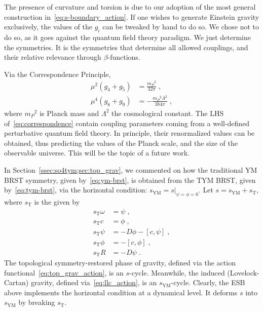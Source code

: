 \documentclass[../main.tex]{subfiles}
\begin{document}
The presence of curvature and torsion is due to our adoption of the most general construction in~\eqref{eq:s-boundary_action}. If one wishes to generate Einstein gravity exclusively, the values of the $ g_i $ can be tweaked by hand to do so. We chose not to do so, as it goes against the quantum field theory paradigm. We just determine the symmetries. It is the symmetries that determine all allowed couplings, and their relative relevance through $ \beta $-functions.

Via the Correspondence Principle,
\begin{subequations}%
  \label{eq:correspondence}
  \begin{align}
    \mu^2 \left( g_4+g_5 \right) & = \frac{{m_P}^2}{32\pi} \;,            \\
    \mu^4 \left( g_8+g_9 \right) & = -\frac{{m_P}^2\Lambda^2}{384\pi} \;,
  \end{align}
\end{subequations}
where ${m_P}^2$ is Planck mass and $\Lambda^2$ the cosmological constant. The LHS of~\eqref{eq:correspondence} contain coupling parameters coming from a well-defined perturbative quantum field theory. In principle, their renormalized values can be obtained, thus predicting the values of the Planck scale, and the size of the observable universe. This will be the topic of a future work.

In Section~\ref{ssec:so4tym;sec:top_grav}, we commented on how the traditional YM BRST symmetry, given by~\eqref{eq:ym-brst}, is obtained from the TYM BRST, given by~\eqref{eq:tym-brst}, via the horizontal condition: $ s_{\text{YM}} = s|_{\psi = \phi = 0} $. Let $ s = s_{\text{YM}} + s_{\text{T}} $, where $ s_{\text{T}} $ is the  given by
\begin{subequations}%
  \label{eq:s_T}
  \begin{align}
    s_{\text{T}} \omega & = \psi \;,                              \\
    s_{\text{T}} c      & = \phi \;,                              \\
    s_{\text{T}} \psi   & = - D \phi - \left[ c, \psi \right] \;, \\
    s_{\text{T}} \phi   & = - \left[ c, \phi \right] \;,          \\
    s_{\text{T}} R      & = - D \psi \;.
  \end{align}
\end{subequations}
The topological symmetry-restored phase of gravity, defined via the action functional~\eqref{eq:top_grav_action}, is an $s$-cycle. Meanwhile, the induced (Lovelock-Cartan) gravity, defined via~\eqref{eq:llc_action}, is an $ s_{\text{YM}} $-cycle. Clearly, the ESB above implements the horizontal condition at a dynamical level. It deforms $ s $ into $ s_{\text{YM}} $ by breaking $ s_{\text{T}} $.
\end{document}
